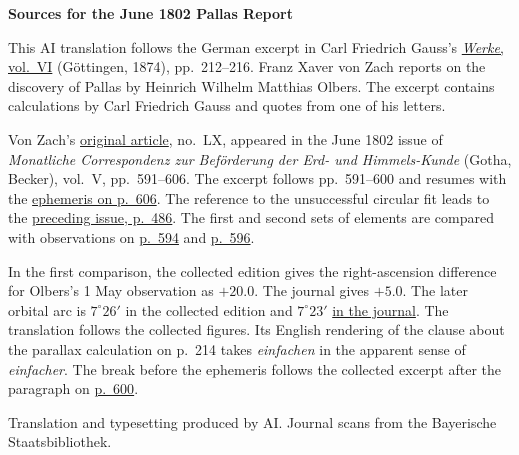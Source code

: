 \clearpage\thispagestyle{empty}
\begin{center}\textbf{Sources for the June 1802 Pallas Report}\end{center}
\noindent This AI translation follows the German excerpt in Carl Friedrich Gauss’s \href{https://gdz.sub.uni-goettingen.de/id/PPN236007467}{\textit{Werke}, vol.~VI} (Göttingen, 1874), pp.~212--216. Franz Xaver von Zach reports on the discovery of Pallas by Heinrich Wilhelm Matthias Olbers. The excerpt contains calculations by Carl Friedrich Gauss and quotes from one of his letters.
\par\smallskip\noindent Von Zach’s \href{https://api.digitale-sammlungen.de/iiif/image/v2/bsb10538597_00607/full/1450,/0/default.jpg}{original article}, no.~LX, appeared in the June 1802 issue of \textit{Monatliche Correspondenz zur Beförderung der Erd- und Himmels-Kunde} (Gotha, Becker), vol.~V, pp.~591--606. The excerpt follows pp.~591--600 and resumes with the \href{https://api.digitale-sammlungen.de/iiif/image/v2/bsb10538597_00624/full/1450,/0/default.jpg}{ephemeris on p.~606}. The reference to the unsuccessful circular fit leads to the \href{https://api.digitale-sammlungen.de/iiif/image/v2/bsb10538597_00498/full/1450,/0/default.jpg}{preceding issue, p.~486}. The first and second sets of elements are compared with observations on \href{https://api.digitale-sammlungen.de/iiif/image/v2/bsb10538597_00610/full/1450,/0/default.jpg}{p.~594} and \href{https://api.digitale-sammlungen.de/iiif/image/v2/bsb10538597_00614/full/1450,/0/default.jpg}{p.~596}.
\par\smallskip\noindent In the first comparison, the collected edition gives the right-ascension difference for Olbers’s 1 May observation as \(+20.0\). The journal gives \(+5.0\). The later orbital arc is \(7^\circ 26'\) in the collected edition and \(7^\circ 23'\) \href{https://api.digitale-sammlungen.de/iiif/image/v2/bsb10538597_00611/full/1450,/0/default.jpg}{in the journal}. The translation follows the collected figures. Its English rendering of the clause about the parallax calculation on p.~214 takes \textit{einfachen} in the apparent sense of \textit{einfacher}. The break before the ephemeris follows the collected excerpt after the paragraph on \href{https://api.digitale-sammlungen.de/iiif/image/v2/bsb10538597_00618/full/1450,/0/default.jpg}{p.~600}.
\par\smallskip\noindent Translation and typesetting produced by AI. Journal scans from the Bayerische Staatsbibliothek.
\clearpage
